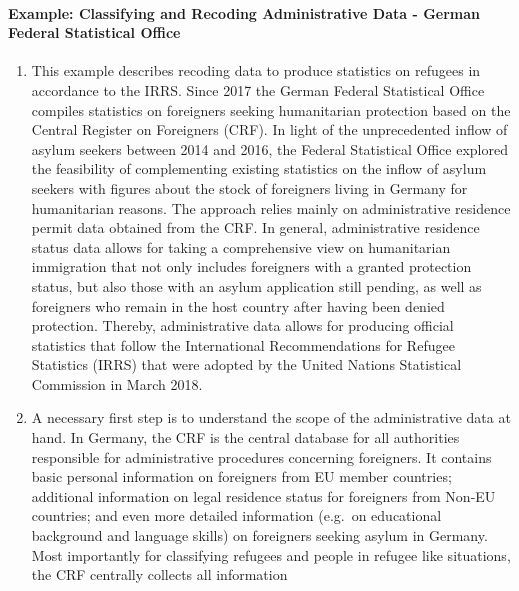 \documentclass[
]{article}
\begin{document}
\hypertarget{example-classifying-and-recoding-administrative-data---german-federal-statistical-office-1}{%
\paragraph{Example: Classifying and Recoding Administrative Data - German Federal Statistical Office}\label{example-classifying-and-recoding-administrative-data---german-federal-statistical-office-1}}

\begin{enumerate}
\def\labelenumi{\arabic{enumi}.}
\setcounter{enumi}{372}
\item
  This example describes recoding data to produce statistics on
  refugees in accordance to the IRRS. Since 2017 the German Federal
  Statistical Office compiles statistics on foreigners seeking
  humanitarian protection based on the Central Register on Foreigners
  (CRF). In light of the unprecedented inflow of asylum seekers
  between 2014 and 2016, the Federal Statistical Office explored the
  feasibility of complementing existing statistics on the inflow of
  asylum seekers with figures about the stock of foreigners living in
  Germany for humanitarian reasons. The approach relies mainly on
  administrative residence permit data obtained from the CRF. In
  general, administrative residence status data allows for taking a
  comprehensive view on humanitarian immigration that not only
  includes foreigners with a granted protection status, but also those
  with an asylum application still pending, as well as foreigners who
  remain in the host country after having been denied protection.
  Thereby, administrative data allows for producing official
  statistics that follow the International Recommendations for Refugee
  Statistics (IRRS) that were adopted by the United Nations
  Statistical Commission in March 2018.
\item
  A necessary first step is to understand the scope of the
  administrative data at hand. In Germany, the CRF is the central
  database for all authorities responsible for administrative
  procedures concerning foreigners. It contains basic personal
  information on foreigners from EU member countries; additional
  information on legal residence status for foreigners from Non-EU
  countries; and even more detailed information (e.g.~on educational
  background and language skills) on foreigners seeking asylum in
  Germany. Most importantly for classifying refugees and people in
  refugee like situations, the CRF centrally collects all information

\end{enumerate}
\end{document}
